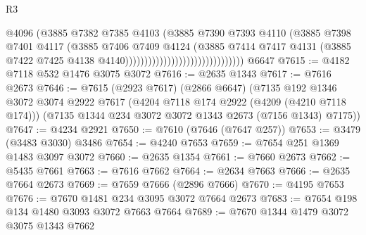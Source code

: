 \begin{lexlean}{R3}
\begin{coremodule}
                                                      @4096
                                                      (@3885
                                                        @7382
                                                        @7385
                                                        @4103
                                                        (@3885
                                                          @7390
                                                          @7393
                                                          @4110
                                                          (@3885
                                                            @7398
                                                            @7401
                                                            @4117
                                                            (@3885
                                                              @7406
                                                              @7409
                                                              @4124
                                                              (@3885
                                                                @7414
                                                                @7417
                                                                @4131
                                                                (@3885
                                                                  @7422
                                                                  @7425
                                                                  @4138
                                                                  @4140)))))))))))))))))))))))))))))))
    @6647
@7615 := @4182 @7118 @532 @1476 @3075 @3072
@7616 := @2635 @1343
@7617 := @7616 @2673
@7646 := @7615
    (@2923 @7617)
    (@2866 @6647)
    (@7135
      @192
      @1346
      @3072
      @3074
      @2922
      @7617
      (@4204 @7118 @174 @2922 (@4209 (@4210 @7118 @174)))
      (@7135 @1344 @234 @3072 @3072 @1343 @2673 (@7156 @1343) @7175))
@7647 := @4234 @2921
@7650 := @7610 (@7646 (@7647 @257))
@7653 := @3479 (@3483 @3030) @3486
@7654 := @4240 @7653
@7659 := @7654 @251 @1369 @1483 @3097 @3072
@7660 := @2635 @1354
@7661 := @7660 @2673
@7662 := @5435 @7661
@7663 := @7616 @7662
@7664 := @2634 @7663
@7666 := @2635 @7664 @2673
@7669 := @7659 @7666 (@2896 @7666)
@7670 := @4195 @7653
@7676 := @7670 @1481 @234 @3095 @3072 @7664 @2673
@7683 := @7654 @198 @134 @1480 @3093 @3072 @7663 @7664
@7689 := @7670 @1344 @1479 @3072 @3075 @1343 @7662

\end{coremodule}
\end{lexlean}
